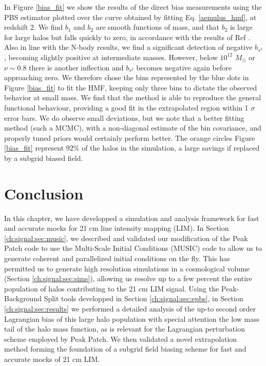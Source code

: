 In Figure \ref{bias_fit} we show the results of the direct bias measurements using the PBS estimator plotted over the curve obtained by fitting Eq. \ref{aemulus_hmf}, at redshift 2. We find $b_1$ and $b_2$ are smooth functions of mass, and that $b_2$ is large for large halos but falls quickly to zero, in accordance with the results of Ref \citep{modietal2017}. Also in line with the N-body results, we find a significant detection of negative $b_{s^2}$, becoming slightly positive at intermediate masses. However, below $10^{12}$ $M_\odot$ or $\nu \sim 0.8$ there is another inflection and $b_{s^2}$ becomes negative again before approaching zero. We therefore chose the bins represented by the blue dots in Figure \ref{bias_fit} to fit the HMF, keeping only three bins to dictate the observed behavior at small mass. We find that the method is able to reproduce the general functional behaviour, providing a good fit in the extrapolated region within 1 $\sigma$ error bars. We do observe small deviations, but we note that a better fitting method (such a MCMC), with a non-diagonal estimate of the bin covariance, and properly tuned priors would certainly perform better. The orange circles Figure \ref{bias_fit} represent $92\%$ of the halos in the simulation, a large savings if replaced by a subgrid biased field.

\section{Conclusion}
\label{ch:signal:sec:conclusion}

In this chapter, we have developped a simulation and analysis framework for fast and accurate mocks for 21 cm line intensity mapping (LIM). In Section \ref{ch:signal:sec:music}, we described  and validated our modification of the Peak Patch code to use the Multi-Scale Initial Conditions (MUSIC) code \citep{music} to allow us to generate coherent and parallelized initial conditions on the fly. This has permitted us to generate high resolution simulations in a cosmological volume (Section \ref{ch:signal:sec:sims}), allowing us resolve up to a few percent the entire population of halos contributing to the 21 cm LIM signal. Using the Peak-Background Split tools developped in Section \ref{ch:signal:sec:epbs}, in Section \ref{ch:signal:sec:results} we performed a detailed analysis of the up-to second order Lagrangian bias of this large halo population with special attention the low mass tail of the halo mass function, as is relevant for the Lagrangian perturbation scheme employed by Peak Patch. We then validated a novel extrapolation method forming the foundation of a subgrid field biasing scheme for fast and accurate mocks of 21 cm LIM.

